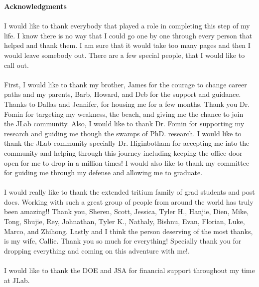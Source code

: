 \begin{center}
	{\large \textbf{Acknowledgments}}\\
\end{center}


\paragraph{}I would like to thank everybody that played a role in completing this step of my life. I know there is no way that I could go one by one through every person that helped and thank them. I am sure that it would take too many pages and then I would leave somebody out. There are a few special people, that I would like to call out. 
\paragraph{}First, I would like to thank my brother, James for the courage to change career paths and my parents, Barb, Howard, and Deb for the support and guidance. Thanks to Dallas and Jennifer, for housing me for a few months. Thank you Dr. Fomin for targeting my weakness, the beach, and giving me the chance to join the JLab community. Also, I would like to thank Dr. Fomin for supporting my research and guiding me though the swamps of PhD. research. I would like to thank the JLab community specially Dr. Higinbotham for accepting me into the community and helping through this journey including keeping the office door open for me to drop in a million times! I would also like to thank my committee for guiding me through my defense and allowing me to graduate. 
\paragraph{}I would really like to thank the extended tritium family of grad students and post docs. Working with such a great group of people from around the world has truly been amazing!! Thank you, Sheren, Scott, Jessica, Tyler H., Hanjie, Dien, Mike, Tong, Shujie, Rey, Johnathan, Tyler K., Nathaly, Bishnu, Evan, Florian, Luke, Marco, and Zhihong. Lastly and I think the person deserving of the most thanks, is my wife, Callie. Thank you so much for everything! Specially thank you for dropping everything and coming on this adventure with me!.

\paragraph{}I would like to thank the DOE and JSA for financial support throughout my time at JLab. 